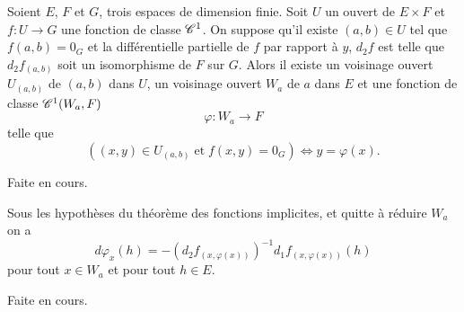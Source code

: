 \documentclass[12pt, class=report,crop=false]{standalone}
\begin{document}
{{\begin{theoreme}\textcolor[rgb]{0.44,0.00,0.87}{
 Soient $E$, $F$ et $G$, trois espaces de dimension finie.  Soit $U$ un ouvert de $E \times F$ et $f: U \rightarrow G$ une fonction de classe
$\mathscr{C}^1$. On suppose qu'il existe $(a,b)  \in U$ tel que $f(a,b)=0_G$ et la diff\'erentielle partielle de $f$ par rapport \`a $y$,
$d_2f$ est telle que $d_2f_{(a,b)}$ soit un isomorphisme de $F$ sur $G$. Alors
il existe un voisinage ouvert $U_{(a,b)}$ de $(a,b)$ dans $U$, un voisinage ouvert $W_a$ de $a$ dans $E$ et une fonction de classe $\mathscr{C}^1(W_a,F)$
\begin{equation*}
  \varphi: W_a \rightarrow F
\end{equation*}
telle que
\begin{equation*}
  ((x,y) \in U_{(a,b)} \;\mathrm{et}\; f(x,y)=0_G)\Leftrightarrow y=\varphi(x).
\end{equation*} }
\end{theoreme}

 Faite en cours.

\begin{proposition} \textcolor[rgb]{0.44,0.00,0.87}{
Sous les hypoth\`eses du th\'eor\`eme des fonctions implicites, et quitte \`a r\'eduire $W_a$ on a
\begin{equation*}
  d\varphi_x(h)=-(d_2f_{(x,\varphi(x))})^{-1}d_1f_{(x,\varphi(x))}(h)
\end{equation*}
pour tout $x \in W_a$ et pour tout $h \in E$.}
\end{proposition}

 Faite en cours.


%

}}
\end{document}
